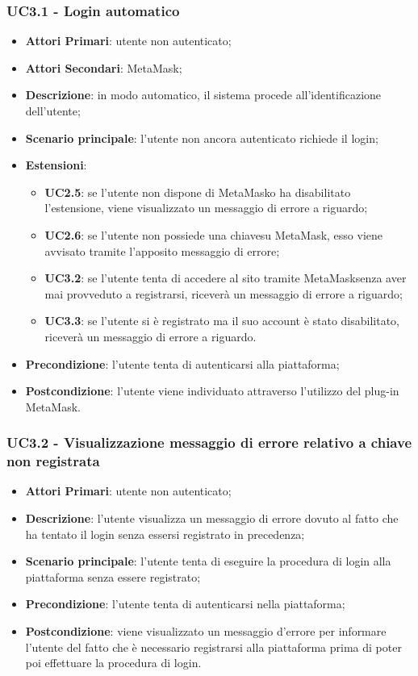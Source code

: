 \subsubsection{UC3.1 - Login automatico}
\begin{itemize}
	\item \textbf{Attori Primari}:
	utente non autenticato;
	\item \textbf{Attori Secondari}:
	MetaMask\glo;
	\item \textbf{Descrizione}:
	in modo automatico, il sistema procede all'identificazione dell'utente;
	\item \textbf{Scenario principale}:
	l'utente non ancora autenticato richiede il login;
	\item \textbf{Estensioni}:
	\begin{itemize}
		\item \textbf{UC2.5}: se l'utente non dispone di MetaMask\glosp o ha disabilitato l'estensione, viene visualizzato un messaggio di errore a riguardo;
		\item \textbf{UC2.6}: se l'utente non possiede una chiave\glosp su MetaMask\glo, esso viene avvisato tramite l'apposito messaggio di errore;
		\item \textbf{UC3.2}: se l'utente tenta di accedere al sito tramite MetaMask\glosp senza aver mai provveduto a registrarsi, riceverà un messaggio di errore a riguardo;
		
		\item \textbf{UC3.3}: se l'utente si è registrato ma il suo account è stato disabilitato, riceverà un messaggio di errore a riguardo.
	\end{itemize}
	\item \textbf{Precondizione}:
	l'utente tenta di autenticarsi alla piattaforma;
	\item \textbf{Postcondizione}:
	l'utente viene individuato attraverso l'utilizzo del plug-in MetaMask\glo.
\end{itemize}
\subsubsection{UC3.2 - Visualizzazione messaggio di errore relativo a chiave non registrata}
\begin{itemize}
	\item \textbf{Attori Primari}:
	utente non autenticato;
	\item \textbf{Descrizione}:
	l'utente visualizza un messaggio di errore dovuto al fatto che ha tentato il login senza essersi registrato in precedenza;
	\item \textbf{Scenario principale}:
	l'utente tenta di eseguire la procedura di login alla piattaforma senza essere registrato;
	\item \textbf{Precondizione}:
	l'utente tenta di autenticarsi nella piattaforma;
	\item \textbf{Postcondizione}: viene visualizzato un messaggio d'errore per informare l'utente del fatto che è necessario registrarsi alla piattaforma prima di poter poi effettuare la procedura di login.
\end{itemize}
